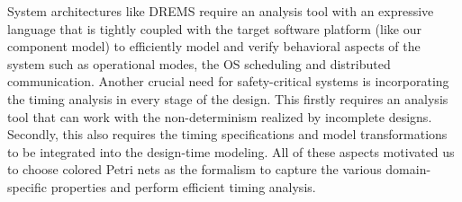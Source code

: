 System architectures like DREMS require an analysis tool with an expressive language that is tightly coupled with the target software platform (like our component model) to efficiently model and verify behavioral aspects of the system such as operational modes, the OS scheduling and distributed communication. Another crucial need for safety-critical systems is incorporating the timing analysis in every stage of the design. This firstly requires an analysis tool that can work with the non-determinism realized by incomplete designs. Secondly, this also requires the timing specifications and model transformations to be integrated into the design-time modeling. All of these aspects motivated us to choose colored Petri nets as the formalism to capture the various domain-specific properties and perform efficient timing analysis.

